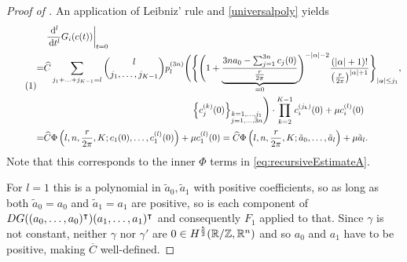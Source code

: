 \begin{proof}[Proof of ]
    An application of Leibniz' rule and \eqref{universalpoly} yields
    \[
        \label{eq:derviativeGc}
        \numberthis
        \begin{split}
            &\restrict{\frac {\d^l} {\d t^l} G_i(c(t))}{t=0}\\
            = &\widehat C \sum_{j_1+ \ldots +j_{K-1}=l} \binom{l}{j_1, \ldots, j_{K-1}} p_l^{(3n)} \Biggl( \Biggl\{ \Biggl( 1+ 
            \underbrace{\frac {3n a_0 - \sum_{j=1}^{3n} c_j(0)} {\frac {r} {2\pi}}}_{=0}
            \Biggr)^{-\abs{\alpha} - 2} \frac {(\abs{\alpha} +1)!} {\left(\frac {r} {2\pi}\right)^{\abs{\alpha}+1}} \Biggr\}_{\abs{\alpha} \le j_1},\\
            & \phantom{\widehat C \sum_{j_1+ \ldots +j_{K-1}=l} \binom{l}{j_1, \ldots, j_{K-1}} p_l^{(3n)} \Biggl(} \left\{ c_j^{(k)}(0) \right\}_{\substack{k=1,\ldots,j_1\\j=1,\ldots,3n}} \Biggr)
            \cdot \prod_{k=2}^{K-1} c_i^{(j_k)}(0) + \mu c_i^{(l)}(0)\\
            = & \widehat C \Phi\left(l,n,\frac {r} {2\pi},K;c_1(0),\ldots,c_1^{(l)}(0)\right) + \mu c_1^{(l)}(0)
            =\widehat C \Phi\left(l,n,\frac {r} {2\pi},K;\tilde a_0,\ldots, \tilde a_l\right) + \mu \tilde a_l.
        \end{split}
    \]
    Note that this corresponds to the inner $\Phi$ terms in \eqref{eq:recursiveEstimateA}.
    
    For $l=1$ this is a polynomial in $\tilde a_0,\tilde a_1$ with positive coefficients, so as long as both $\tilde a_0 = a_0$ and $\tilde a_1 = a_1$ are positive, so is each component of $DG((a_0,\ldots,a_0)^\intercal)(a_1,\ldots,a_1)^\intercal$ and consequently $F_1$ applied to that.
    Since $\gamma$ is not constant, neither $\gamma$ nor $\gamma'$ are $0 \in H^{{\frac 5 2}}(\mathbb{R}/\mathbb{Z},\mathbb{R}^n)$ and so $a_0$ and $a_1$ have to be positive, making $\overline C$ well-defined.
    

\end{proof}

